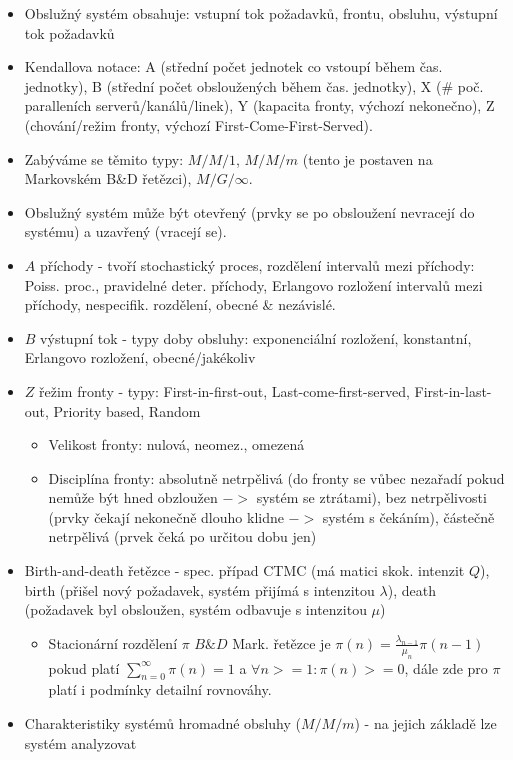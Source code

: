 \documentclass[a4paper,hidelinks]{article}
\begin{document}
\begin{itemize}
    \item Obslužný systém obsahuje: vstupní tok požadavků, frontu, obsluhu, výstupní tok požadavků
    \item Kendallova notace: A (střední počet jednotek co vstoupí během čas. jednotky), B (střední počet obsloužených během čas. jednotky), X (\# poč. paralleních serverů/kanálů/linek), Y (kapacita fronty, výchozí nekonečno), Z (chování/režim fronty, výchozí First-Come-First-Served).
    \item Zabýváme se těmito typy: $M/M/1$, $M/M/m$ (tento je postaven na Markovském B\&D řetězci), $M/G/\infty$.
    \item Obslužný systém může být otevřený (prvky se po obsloužení nevracejí do systému) a uzavřený (vracejí se).
    \item $A$ příchody - tvoří stochastický proces, rozdělení intervalů mezi příchody: Poiss. proc., pravidelné deter. příchody, Erlangovo rozložení intervalů mezi příchody, nespecifik. rozdělení, obecné \& nezávislé.
    \item $B$ výstupní tok - typy doby obsluhy: exponenciální rozložení, konstantní, Erlangovo rozložení, obecné/jakékoliv
    \item $Z$ řežim fronty - typy: First-in-first-out, Last-come-first-served, First-in-last-out, Priority based, Random
    \begin{itemize}
        \item Velikost fronty: nulová, neomez., omezená
        \item Disciplína fronty: absolutně netrpělivá (do fronty se vůbec nezařadí pokud nemůže být hned obzloužen $->$ systém se ztrátami), bez netrpělivosti (prvky čekají nekonečně dlouho klidne $->$ systém s čekáním), částečně netrpělivá (prvek čeká po určitou dobu jen)
    \end{itemize}
    \item Birth-and-death řetězce - spec. případ CTMC (má matici skok. intenzit $Q$), birth (přišel nový požadavek, systém přijímá s intenzitou $\lambda$), death (požadavek byl obsloužen, systém odbavuje s intenzitou $\mu$)
    \begin{itemize}
        \item Stacionární rozdělení $\pi$ $B\&D$ Mark. řetězce je $\pi(n)=\frac{\lambda_{n-1}}{\mu_n}\pi(n-1)$ pokud platí $\sum_{n=0}^{\infty}\pi(n)=1$ a $\forall n>=1:\pi(n)>=0$, dále zde pro $\pi$ platí i podmínky detailní rovnováhy.
    \end{itemize}
    \item Charakteristiky systémů hromadné obsluhy ($M/M/m$) - na jejich základě lze systém analyzovat

\end{itemize}
\end{document}
